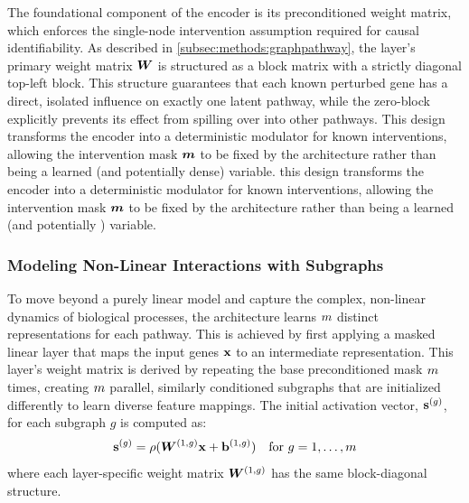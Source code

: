 The foundational component of the encoder is its preconditioned weight matrix, which enforces the single-node intervention assumption required for causal identifiability.
As described in \cref{subsec:methods:graphpathway}, the layer's primary weight matrix ${\bm{W}}$ is structured as a block matrix with a strictly diagonal top-left block.
This structure guarantees that each known perturbed gene has a direct, isolated influence on exactly one latent pathway, while the zero-block explicitly prevents its effect from spilling over into other pathways.
This design transforms the encoder into a deterministic modulator for known interventions, allowing the intervention mask ${\bm{m}}$ to be fixed by the architecture rather than being a learned (and potentially dense) variable.
 this design transforms the encoder into a deterministic modulator for known interventions, allowing the intervention mask ${\bm{m}}$ to be fixed by the architecture rather than being a learned (and potentially ) variable.

\subsubsection{Modeling Non-Linear Interactions with Subgraphs}
\label{app:graphpathway:subgraphs}

To move beyond a purely linear model and capture the complex, non-linear dynamics of biological processes, the architecture learns $m$ distinct representations for each pathway.
This is achieved by first applying a masked linear layer that maps the input genes ${\mathbf{x}}$ to an intermediate representation.
This layer's weight matrix is derived by repeating the base preconditioned mask $m$ times, creating $m$ parallel, similarly conditioned subgraphs that are initialized differently to learn diverse feature mappings.
The initial activation vector, $\pathwayactivation^{(g)}$, for each subgraph $g$ is computed as:
\begin{equation}
    \pathwayactivation^{(g)} = \activationfunc(\weightmatrix^{(1, g)}\variables + \vect{b}^{(1,g)}) \quad \text{for } g=1, \dots, \numgraphs
\end{equation}
where each layer-specific weight matrix ${\bm{W}}^{(1, g)}$ has the same block-diagonal structure.

